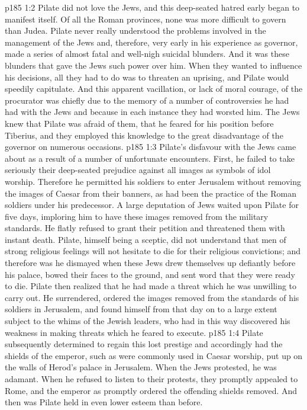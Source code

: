 \vs p185 1:2 Pilate did not love the Jews, and this deep\hyp{}seated hatred early began to manifest itself. Of all the Roman provinces, none was more difficult to govern than Judea. Pilate never really understood the problems involved in the management of the Jews and, therefore, very early in his experience as governor, made a series of almost fatal and well\hyp{}nigh suicidal blunders. And it was these blunders that gave the Jews such power over him. When they wanted to influence his decisions, all they had to do was to threaten an uprising, and Pilate would speedily capitulate. And this apparent vacillation, or lack of moral courage, of the procurator was chiefly due to the memory of a number of controversies he had had with the Jews and because in each instance they had worsted him. The Jews knew that Pilate was afraid of them, that he feared for his position before Tiberius, and they employed this knowledge to the great disadvantage of the governor on numerous occasions.
\vs p185 1:3 Pilate’s disfavour with the Jews came about as a result of a number of unfortunate encounters. First, he failed to take seriously their deep\hyp{}seated prejudice against all images as symbols of idol worship. Therefore he permitted his soldiers to enter Jerusalem without removing the images of Caesar from their banners, as had been the practice of the Roman soldiers under his predecessor. A large deputation of Jews waited upon Pilate for five days, imploring him to have these images removed from the military standards. He flatly refused to grant their petition and threatened them with instant death. Pilate, himself being a sceptic, did not understand that men of strong religious feelings will not hesitate to die for their religious convictions; and therefore was he dismayed when these Jews drew themselves up defiantly before his palace, bowed their faces to the ground, and sent word that they were ready to die. Pilate then realized that he had made a threat which he was unwilling to carry out. He surrendered, ordered the images removed from the standards of his soldiers in Jerusalem, and found himself from that day on to a large extent subject to the whims of the Jewish leaders, who had in this way discovered his weakness in making threats which he feared to execute.
\vs p185 1:4 Pilate subsequently determined to regain this lost prestige and accordingly had the shields of the emperor, such as were commonly used in Caesar worship, put up on the walls of Herod’s palace in Jerusalem. When the Jews protested, he was adamant. When he refused to listen to their protests, they promptly appealed to Rome, and the emperor as promptly ordered the offending shields removed. And then was Pilate held in even lower esteem than before.
